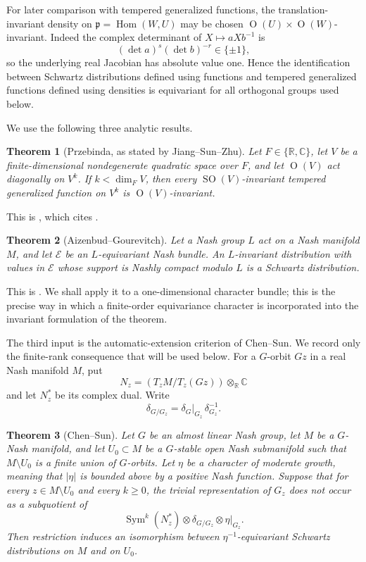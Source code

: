 \documentclass[11pt,reqno]{amsart}
\numberwithin{equation}{section}
\newtheorem{theorem}{Theorem}[section]
\theoremstyle{definition}
\theoremstyle{remark}
\newcommand{\C}{\mathbb C}
\newcommand{\R}{\mathbb R}
\newcommand{\SO}{\operatorname{SO}}
\newcommand{\Or}{\operatorname{O}}
\newcommand{\Sym}{\operatorname{Sym}}
\newcommand{\Hom}{\operatorname{Hom}}
\newcommand{\fp}{\mathfrak p}
\begin{document}
For later comparison with tempered generalized functions, the
translation-invariant density on $\fp=\Hom(W,U)$ may be chosen
$\Or(U)\times\Or(W)$-invariant.  Indeed the complex determinant of
$X\mapsto aXb^{-1}$ is
\[
  (\det a)^s(\det b)^{-r}\in\{\pm1\},
\]
so the underlying real Jacobian has absolute value one.  Hence the
identification between Schwartz distributions defined using functions and
tempered generalized functions defined using densities is equivariant for
all orthogonal groups used below.

We use the following three analytic results.

\begin{theorem}[Przebinda, as stated by Jiang--Sun--Zhu]\label{spin:thm:Przebinda}
Let $F\in\{\R,\C\}$, let $V$ be a finite-dimensional nondegenerate quadratic
space over $F$, and let $\Or(V)$ act diagonally on $V^k$.  If
$k<\dim_F V$, then every $\SO(V)$-invariant tempered generalized function on
$V^k$ is $\Or(V)$-invariant.
\end{theorem}

This is \cite[Proposition~1.5]{JSZ}, which cites
\cite[Theorem~C.7]{Przebinda}.

\begin{theorem}[Aizenbud--Gourevitch]\label{spin:thm:AGcompact}
Let a Nash group $L$ act on a Nash manifold $M$, and let $\mathcal E$ be an
$L$-equivariant Nash bundle.  An $L$-invariant distribution with values in
$\mathcal E$ whose support is Nashly compact modulo $L$ is a Schwartz
distribution.
\end{theorem}

This is \cite[Theorem~B.4.1]{AG09}.  We shall apply it to a one-dimensional
character bundle; this is the precise way in which a finite-order equivariance
character is incorporated into the invariant formulation of the theorem.

The third input is the automatic-extension criterion of Chen--Sun.  We record
only the finite-rank consequence that will be used below.  For a $G$-orbit
$Gz$ in a real Nash manifold $M$, put
\[
  N_z=(T_zM/T_z(Gz))\otimes_{\R}\C
\]
and let $N_z^*$ be its complex dual.  Write
\[
  \delta_{G/G_z}=\delta_G|_{G_z}\,\delta_{G_z}^{-1}.
\]

\begin{theorem}[Chen--Sun]\label{spin:thm:ChenSun}
Let $G$ be an almost linear Nash group, let $M$ be a $G$-Nash manifold, and
let $U_0\subset M$ be a $G$-stable open Nash submanifold such that
$M\setminus U_0$ is a finite union of $G$-orbits.  Let $\eta$ be a character
of moderate growth, meaning that $|\eta|$ is bounded above by a positive Nash
function.  Suppose that for every $z\in M\setminus U_0$ and every
$k\ge0$, the trivial representation of $G_z$ does not occur as a subquotient
of
\begin{equation}\label{spin:eq:CS-general}
  \Sym^k(N_z^*)\otimes\delta_{G/G_z}\otimes\eta|_{G_z}.
\end{equation}
Then restriction induces an isomorphism between $\eta^{-1}$-equivariant
Schwartz distributions on $M$ and on $U_0$.
\end{theorem}
\end{document}
